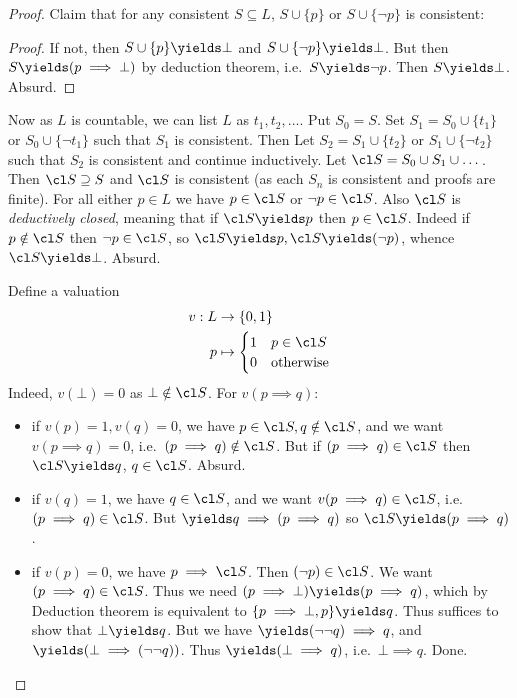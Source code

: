 \documentclass[a4paper]{article}
\begin{document}
\begin{proof}
  Claim that for any consistent \(S \subseteq L\), \(S \cup \{p\}\) or \(S \cup \{\neg p\}\) is consistent:

  \begin{proof}
    If not, then \(S \cup \{p\} \yields \bot\) and \(S \cup \{\neg p\} \yields \bot\). But then \(S \yields (p \implies \bot)\) by deduction theorem, i.e.\ \(S \yields \neg p\). Then \(S \yields \bot\). Absurd.
  \end{proof}

  Now as \(L\) is countable, we can list \(L\) as \(t_1, t_2, \dots \). Put \(S_0 = S\). Set \(S_1 = S_0 \cup \{t_1\}\) or \(S_0 \cup \{\neg t_1\}\) such that \(S_1\) is consistent. Then Let \(S_2 = S_1 \cup \{t_2\}\) or \(S_1 \cup \{\neg t_2\}\) such that \(S_2\) is consistent and continue inductively. Let \(\cl S = S_0 \cup S_1 \cup \dots\). Then \(\cl S \supseteq S\) and \(\cl S\) is consistent (as each \(S_n\) is consistent and proofs are finite). For all either \(p \in L\) we have \(p \in \cl S\) or \(\neg p \in \cl S\). Also \(\cl S\) is \emph{deductively closed}, meaning that if \(\cl S \yields p\) then \(p \in \cl S\). Indeed if \(p \notin \cl S\) then \(\neg p \in \cl S\), so \(\cl S \yields p, \cl S \yields (\neg p)\), whence \(\cl S \yields \bot\). Absurd.

  Define a valuation
  \begin{align*}
    v: L &\to \{0, 1\} \\
    p &\mapsto
        \begin{cases}
          1 & p \in \cl S \\
          0 & \text{otherwise}
        \end{cases}
  \end{align*}
  Indeed, \(v(\bot) = 0\) as \(\bot \notin \cl S\). For \(v(p \implies q)\):
  \begin{itemize}
  \item if \(v(p) = 1, v(q) = 0\), we have \(p \in \cl S, q \notin \cl S\), and we want \(v(p \implies q) = 0\), i.e.\ \((p \implies q) \notin \cl S\). But if \((p \implies q) \in \cl S\) then \(\cl S \yields q\), \(q \in \cl S\). Absurd.
  \item if \(v(q) = 1\), we have \(q \in \cl S\), and we want \(v(p \implies q) \in \cl S\), i.e.\ \((p \implies q) \in \cl S\). But \(\yields q \implies (p \implies q)\) so \(\cl S \yields (p \implies q)\).
  \item if \(v(p) = 0\), we have \(p \implies \cl S\). Then \((\neg p) \in \cl S\). We want \((p \implies q) \in \cl S\). Thus we need \((p \implies \bot) \yields (p \implies q)\), which by Deduction theorem is equivalent to \(\{p \implies \bot, p\} \yields q\). Thus suffices to show that \(\bot \yields q\). But we have \(\yields (\neg \neg q) \implies q\), and \(\yields (\bot \implies (\neg \neg q))\). Thus \(\yields (\bot \implies q)\), i.e.\ \(\bot \implies q\). Done.
  \end{itemize}
\end{proof}
\end{document}
